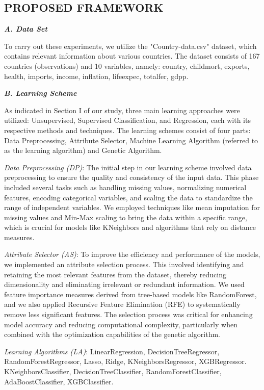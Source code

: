 \documentclass{article}
\begin{document}
\begin{multicols}{2}
\section{PROPOSED FRAMEWORK}
\textbf{\textit{A. Data Set}}

To carry out these experiments, we utilize the "Country-data.csv" dataset, which contains relevant information about various countries. The dataset consists of 167 countries (observations) and 10 variables, namely: country, childmort, exports, health, imports, income, inflation, lifeexpec, totalfer, gdpp.

\textbf{\textit{B. Learning Scheme}}

As indicated in Section I of our study, three main learning approaches were utilized: Unsupervised, Supervised Classification, and Regression, each with its respective methods and techniques. The learning schemes consist of four parts: Data Preprocessing, Attribute Selector, Machine Learning Algorithm (referred to as the learning algorithm) and Genetic Algorithm.

\textit{Data Preprocessing (DP)}: The initial step in our learning scheme involved data preprocessing to ensure the quality and consistency of the input data. This phase included several tasks such as handling missing values, normalizing numerical features, encoding categorical variables, and scaling the data to standardize the range of independent variables. We employed techniques like mean imputation for missing values and Min-Max scaling to bring the data within a specific range, which is crucial for models like KNeighbors and algorithms that rely on distance measures.

\textit{Attribute Selector (AS)}: To improve the efficiency and performance of the models, we implemented an attribute selection process. This involved identifying and retaining the most relevant features from the dataset, thereby reducing dimensionality and eliminating irrelevant or redundant information. We used feature importance measures derived from tree-based models like RandomForest, and we also applied Recursive Feature Elimination (RFE) to systematically remove less significant features. The selection process was critical for enhancing model accuracy and reducing computational complexity, particularly when combined with the optimization capabilities of the genetic algorithm.

\textit{Learning Algorithms (LA)}: LinearRegression, DecisionTreeRegressor, RandomForestRegressor, Lasso, Ridge, KNeighborsRegressor, XGBRegressor. KNeighborsClassifier, DecisionTreeClassifier, RandomForestClassifier, AdaBoostClassifier, XGBClassifier.


\end{multicols}
\end{document}
